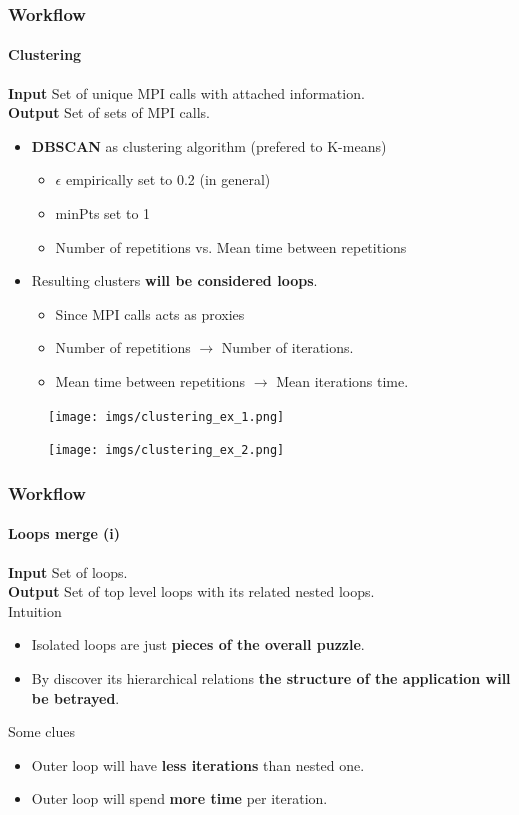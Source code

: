 \documentclass{beamer}
\begin{document}
\begin{frame}
\frametitle{Workflow}
\framesubtitle{Clustering}

\textbf{Input} Set of unique MPI calls with attached information.\\
\textbf{Output} Set of sets of MPI calls.
\vspace{10px}
\pause

\begin{itemize}
	\item \textbf{DBSCAN} as clustering algorithm (prefered to K-means)
	\begin{itemize}
		\item $\epsilon$ empirically set to 0.2 (in general)
		\item minPts set to 1
		\item Number of repetitions vs. Mean time between repetitions
	\end{itemize}
\pause
	\item Resulting clusters \textbf{will be considered loops}.
	\begin{itemize}
		\item Since MPI calls acts as proxies
		\item Number of repetitions $\rightarrow$ Number of iterations.
		\item Mean time between repetitions $\rightarrow$ Mean iterations time.
	\end{itemize}
\end{itemize}
\pause
\begin{multicols}{2}
	\begin{figure}
		\texttt{[image: imgs/clustering\_ex\_1.png]}
	\end{figure}
	\begin{figure}
		\texttt{[image: imgs/clustering\_ex\_2.png]}
	\end{figure}
\end{multicols}
\end{frame}

\begin{frame}
\frametitle{Workflow}
\framesubtitle{Loops merge (i)}
\textbf{Input} Set of loops.\\
\textbf{Output} Set of top level loops with its related nested loops.\\
\vspace{10px}
\pause
Intuition
\begin{itemize}
	\item Isolated loops are just \textbf{pieces of the overall puzzle}.
	\item By discover its hierarchical relations \textbf{the structure of the application will be betrayed}.
\end{itemize}
\pause
Some clues
\begin{itemize}
	\item Outer loop will have \textbf{less iterations} than nested one.
	\item Outer loop will spend \textbf{more time} per iteration.
\end{itemize}
\end{frame}
\end{document}
